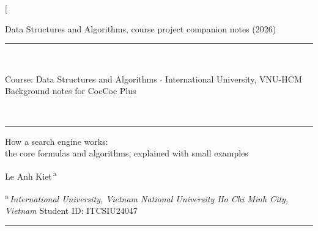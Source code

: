 \documentclass[9pt,twocolumn,a4paper]{extarticle}
\begin{document}
\thispagestyle{first}

\twocolumn[{%
\begin{@twocolumnfalse}
\vspace{-0.3cm}
\begin{center}\small\color{linkblue}Data Structures and Algorithms, course project companion notes (2026)\end{center}
\vspace{-0.1cm}
\noindent\rule{\textwidth}{0.5pt}\\[-2pt]
\noindent\colorbox{bannergray}{\parbox{\dimexpr\textwidth-2\fboxsep}{\centering\vspace{3pt}
  {\small Course: Data Structures and Algorithms \;$\cdot$\; International University, VNU-HCM}\\[7pt]
  {\Large Background notes for CocCoc Plus}\vspace{4pt}}}\\[-1pt]
\noindent\rule{\textwidth}{2.2pt}

\vspace{0.55cm}
{\fontsize{16.5}{20}\selectfont How a search engine works:\\the core formulas and algorithms, explained with small examples\par}
\vspace{0.4cm}
{\large Le Anh Kiet\textsuperscript{\,a}\par}
\vspace{0.2cm}
{\scriptsize\textsuperscript{a}\,\textit{International University, Vietnam National University Ho Chi Minh City, Vietnam} \quad Student ID: ITCSIU24047\par}
\vspace{0.3cm}
\noindent\rule{\textwidth}{0.4pt}
\vspace{0.25cm}


\end{@twocolumnfalse}}
\end{document}
